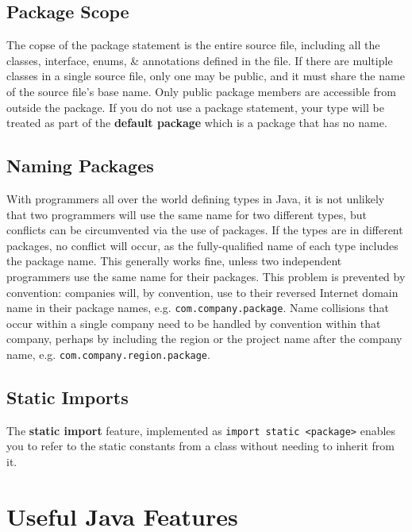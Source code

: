\documentclass[a4paper,11pt]{article}
\begin{document}
\subsection{Package Scope}
The copse of the package statement is the entire source file, including all the classes, interface, enums, \& annotations 
defined in the file.
If there are multiple classes in a single source file, only one may be public, and it must share the name of the source 
file's base name. 
Only public package members are accessible from outside the package.
If you do not use a package statement, your type will be treated as part of the \textbf{default package} which is a package
that has no name.

\subsection{Naming Packages}
With programmers all over the world defining types in Java, it is not unlikely that two programmers will use the same name
for two different types, but conflicts can be circumvented via the use of packages. 
If the types are in different packages, no conflict will occur, as the fully-qualified name of each type includes the 
package name. 
This generally works fine, unless two independent programmers use the same name for their packages. 
This problem is prevented by convention: companies will, by convention, use to their reversed Internet domain name in their
package names, e.g. \verb|com.company.package|. 
Name collisions that occur within a single company need to be handled by convention within that company, perhaps by including
the region or the project name after the company name, e.g. \verb|com.company.region.package|.

\subsection{Static Imports}
The \textbf{static import} feature, implemented as \verb|import static <package>| enables you to refer to the static constants 
from a class without needing to inherit from it.

\section{Useful Java Features}
\end{document}
